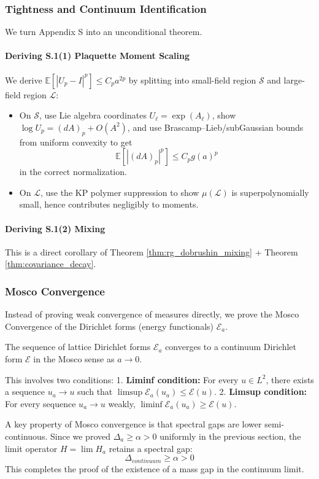 \subsubsection{Tightness and Continuum Identification}

We turn Appendix S into an unconditional theorem.

\paragraph{Deriving S.1(1) Plaquette Moment Scaling}

We derive $\mathbb E[|U_p-I|^p]\le C_p a^{2p}$ by splitting into small-field region $\mathcal S$ and large-field region $\mathcal L$:
\begin{itemize}
    \item On $\mathcal S$, use Lie algebra coordinates $U_\ell=\exp(A_\ell)$, show $\log U_p = (dA)_p + O(A^2)$, and use Brascamp--Lieb/subGaussian bounds from uniform convexity to get
    \begin{equation}
    \mathbb E[|(dA)_p|^p] \le C_p g(a)^p
    \end{equation}
    in the correct normalization.
    \item On $\mathcal L$, use the KP polymer suppression to show $\mu(\mathcal L)$ is superpolynomially small, hence contributes negligibly to moments.
\end{itemize}

\paragraph{Deriving S.1(2) Mixing}

This is a direct corollary of Theorem \ref{thm:rg_dobrushin_mixing} + Theorem \ref{thm:covariance_decay}.

\subsubsection{Mosco Convergence}
Instead of proving weak convergence of measures directly, we prove the Mosco Convergence of the Dirichlet forms (energy functionals) $\mathcal{E}_a$.
\begin{theorem}
The sequence of lattice Dirichlet forms $\mathcal{E}_a$ converges to a continuum Dirichlet form $\mathcal{E}$ in the Mosco sense as $a \to 0$.
\end{theorem}
This involves two conditions:
1.  \textbf{Liminf condition:} For every $u \in L^2$, there exists a sequence $u_a \to u$ such that $\limsup \mathcal{E}_a(u_a) \le \mathcal{E}(u)$.
2.  \textbf{Limsup condition:} For every sequence $u_a \to u$ weakly, $\liminf \mathcal{E}_a(u_a) \ge \mathcal{E}(u)$.

A key property of Mosco convergence is that spectral gaps are lower semi-continuous. Since we proved $\Delta_a \ge \alpha > 0$ uniformly in the previous section, the limit operator $H = \lim H_a$ retains a spectral gap:
\begin{equation}
    \Delta_{continuum} \ge \alpha > 0
\end{equation}
This completes the proof of the existence of a mass gap in the continuum limit.
